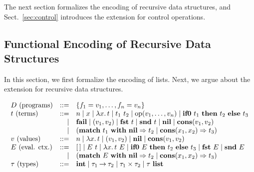 The next section formalizes the encoding of recursive data
structures, and Sect.~\ref{sec:control} introduces the extension for
control operations.

\subsection{Functional Encoding of Recursive Data Structures}
\label{sec:recdata}

In this section, we first formalize the encoding of lists. Next, we argue about the
extension for recursive data structures.

\[
\begin{array}{lrl}
D\text{ (programs)} &::=& \{f_1 = v_1, \dots, f_n = v_n\} \\
t\text{ (terms)}
  &::=& n \mid x \mid \lambda{x}.\,{t} \mid t_1\ t_2 \mid \mathrm{op}({v_1,\dots,v_n}) \mid \mathbf{if0}~{t_1}~\mathbf{then}~{t_2}~\mathbf{else}~{t_3} \\
 &\mid& \mathbf{fail} \mid ({v_1},{v_2}) \mid {\mathbf{fst}}~{t} \mid {\mathbf{snd}}~{t} \mid \mathbf{nil} \mid \mathbf{cons}({v_1},{v_2}) \\
 &\mid& (\mathbf{match}\ {t_1}\ \mathbf{with}\ \mathbf{nil} \Rightarrow {t_2} \mid \mathbf{cons}({x_1},{x_2}) \Rightarrow {t_3}) \\

v\text{ (values)}
  &::=& n \mid \lambda{x}.\,{t} \mid ({v_1},{v_2}) \mid \mathbf{nil} \mid \mathbf{cons}({v_1},{v_2}) \\

E\text{ (eval. ctx.)}
  &::=& [\,] \mid E\ t \mid {\lambda{x}.\,{t}}~{E} \mid \mathbf{if0}~{E}~\mathbf{then}~{t_2}~\mathbf{else}~{t_3} \mid {\mathbf{fst}}~{E} \mid {\mathbf{snd}}~{E} \\
 &\mid& (\mathbf{match}\ {E}\ \mathbf{with}\ \mathbf{nil} \Rightarrow {t_2} \mid \mathbf{cons}({x_1},{x_2}) \Rightarrow {t_3}) \\

\tau\text{ (types)} &::=& \mathbf{int} \mid {\tau_1}\mathbin{\rightarrow}{\tau_2} \mid {\tau_1}\mathbin{\times}{\tau_2} \mid {\tau}\ \mathbf{list} \\
\end{array}
\]

